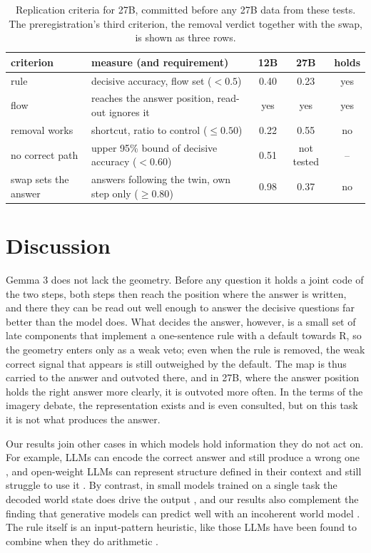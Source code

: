 \documentclass{article}
\begin{document}
\begin{table}[t]
  \centering
  \small
  \caption{Replication criteria for 27B, committed before any 27B data from these tests. The preregistration's third
  criterion, the removal verdict together with the swap, is shown as three rows.}
  \label{tab:replication}
  \begin{tabular}{@{}llccc@{}}
    \toprule
    criterion & measure (and requirement) & 12B & 27B & holds \\
    \midrule
    rule & decisive accuracy, flow set ($<0.5$) & 0.40 & 0.23 & yes \\
    flow & reaches the answer position, read-out ignores it & yes & yes & yes \\
    removal works & shortcut, ratio to control ($\le 0.50$) & 0.22 & 0.55 & no \\
    no correct path & upper 95\% bound of decisive accuracy ($<0.60$) & 0.51 & not tested & -- \\
    swap sets the answer & answers following the twin, own step only ($\ge 0.80$) & 0.98 & 0.37 & no \\
    \bottomrule
  \end{tabular}
\end{table}

\section{Discussion}
Gemma 3 does not lack the geometry. Before any question it holds a joint code of the two steps, both steps then
reach the position where the answer is written, and there they can be read out well enough to answer the decisive
questions far better than the model does. What decides the answer, however, is a small set of late components that
implement a one-sentence rule with a default towards R, so the geometry enters only as a weak veto; even when the rule
is removed, the weak correct signal that appears is still outweighed by the default. The map is thus carried to the
answer and outvoted there, and in 27B, where the answer position holds the right answer more clearly, it is outvoted
more often. In the terms of the imagery debate, the representation exists and is even consulted, but on this task it
is not what produces the answer.

Our results join other cases in which models hold information they do not act on. For example, LLMs can encode the correct answer
and still produce a wrong one \citep{orgad2025know}, and open-weight LLMs can represent structure defined in their
context and still struggle to use it \citep{lepori2026incontext}. By contrast, in small models trained on a single
task the decoded world state does drive the output \citep{li2023othello,nanda2023linear}, and our results also
complement the finding that generative models can predict well with an incoherent world model \citep{vafa2024world}.
The rule itself is an input-pattern heuristic, like those LLMs have been found to combine when they do arithmetic
\citep{nikankin2025heuristics}.
\end{document}
